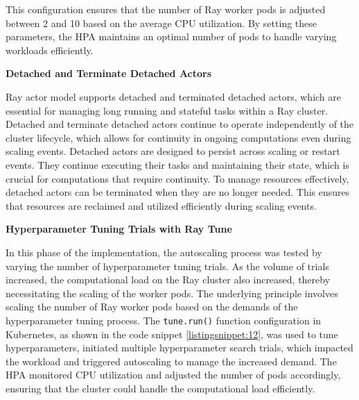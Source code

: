 This configuration ensures that the number of Ray worker pods is adjusted between 2 and 10 based on the average CPU utilization. By setting these parameters, the HPA maintains an optimal number of pods to handle varying workloads efficiently. \cite{Kubernetes_doc}

\textbf{Detached and Terminate Detached Actors}

Ray actor model supports detached and terminated detached actors, which are essential for managing long running and stateful tasks within a Ray cluster. Detached and terminate detached actors continue to operate independently of the cluster lifecycle, which allows for continuity in ongoing computations even during scaling events. Detached actors are designed to persist across scaling or restart events. They continue executing their tasks and maintaining their state, which is crucial for computations that require continuity. To manage resources effectively, detached actors can be terminated when they are no longer needed. This ensures that resources are reclaimed and utilized efficiently during scaling events. \cite{ray_doc}

\clearpage

\textbf{Hyperparameter Tuning Trials with Ray Tune}

In this phase of the implementation, the autoscaling process was tested by varying the number of hyperparameter tuning trials. As the volume of trials increased, the computational load on the Ray cluster also increased, thereby necessitating the scaling of the worker pods. The underlying principle involves scaling the number of Ray worker pods based on the demands of the hyperparameter tuning process. The \texttt{tune.run()} function configuration in Kubernetes, as shown in the code snippet \autoref{listingsnippet:12}, was used to tune hyperparameters, initiated multiple hyperparameter search trials, which impacted the workload and triggered autoscaling to manage the increased demand. The HPA monitored CPU utilization and adjusted the number of pods accordingly, ensuring that the cluster could handle the computational load efficiently. \cite{ray_doc}

